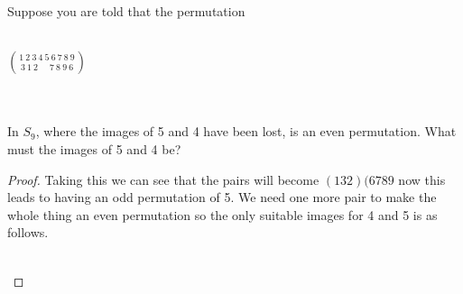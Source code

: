 \documentclass[12pt]{article}
\newenvironment{problem}[2][Problem]{\begin{trivlist}
\item[\hskip \labelsep {\bfseries #1}\hskip \labelsep {\bfseries #2.}]}{\end{trivlist}}
\begin{document}
\begin{problem}{3.3.5}
Suppose you are told that the permutation \\ \\
\centerline{$\displaystyle{1 \: 2 \: 3 \: 4\: 5\: 6\: 7\: 8 \: 9 \choose 3 \: 1 \: 2 \: \: \: \: \: \: 7 \: 8 \: 9 \: 6}$} \\ \\
In $S_9$, where the images of 5 and 4 have been lost, is an even permutation. What must the images of 5 and 4 be? \\
\end{problem}

\begin{proof} 
Taking this we can see that the pairs will become $(132)(6789$ now this leads to having an odd permutation of 5. We need one more pair to make the whole thing an even permutation so the only suitable images for 4 and 5 is as follows. \\ \\
\centerline{} 
\end{proof}


\end{document}
